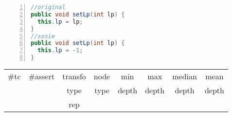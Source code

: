 \begin{minipage}{\columnwidth}
\begin{lstlisting}[caption={\texttt{setLp} in Rhino and a sosie},language=java,numbers=left]
//original
public void setLp(int lp) {
  this.lp = lp;
}
//sosie
public void setLp(int lp) {
  this.lp = -1;
}
\end{lstlisting}
\tabcolsep=0.11cm
\begin{tabular}{>{\small}c>{\small}c>{\small}c>{\small}c>{\small}c>{\small}c>{\small}c>{\small}c}
\hline
\rowcolor{lightgray} \#tc & \#assert & transfo & node & min & max & median & mean   \\
\rowcolor{lightgray}  & & type & type & depth  & depth & depth & depth  \\ 
\hline
&  & rep &  &  &  &  & \\
\hline
\end{tabular}
\end{minipage}
